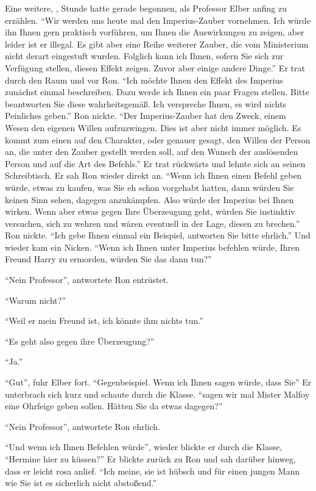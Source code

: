 Eine weitere, , Stunde \VgddK hatte gerade begonnen, als Professor Elber anfing zu erzählen. \enquote{Wir werden uns heute mal den Imperius-Zauber vornehmen. Ich würde ihn Ihnen gern praktisch vorführen, um Ihnen die Auswirkungen zu zeigen, aber leider ist er illegal. Es gibt aber eine Reihe weiterer Zauber, die vom Ministerium nicht derart eingestuft wurden. Folglich kann ich Ihnen, sofern Sie sich zur Verfügung stellen, diesen Effekt zeigen. Zuvor aber einige andere Dinge.} Er trat durch den Raum und vor Ron. \enquote{Ich möchte Ihnen den Effekt des Imperius zunächst einmal beschreiben. Dazu werde ich Ihnen ein paar Fragen stellen. Bitte beantworten Sie diese wahrheitsgemäß. Ich verspreche Ihnen, es wird nichts Peinliches geben.} Ron nickte. \enquote{Der Imperius-Zauber hat den Zweck, einem Wesen den eigenen Willen aufzuzwingen. Dies ist aber nicht immer möglich. Es kommt zum einen auf den Charakter, oder genauer gesagt, den Willen der Person an, die unter den Zauber gestellt werden soll, auf den Wunsch der auslösenden Person und auf die Art des Befehls.} Er trat rückwärts und lehnte sich an seinen Schreibtisch. Er sah Ron wieder direkt an. \enquote{Wenn ich Ihnen einen Befehl geben würde, etwas zu kaufen, was Sie eh schon vorgehabt hatten, dann würden Sie keinen Sinn sehen, dagegen anzukämpfen. Also würde der Imperius bei Ihnen wirken. Wenn aber etwas gegen Ihre Überzeugung geht, würden Sie instinktiv versuchen, sich zu wehren und wären eventuell in der Lage, diesen zu brechen.} Ron nickte. \enquote{Ich gebe Ihnen einmal ein Beispiel, antworten Sie bitte ehrlich.} Und wieder kam ein Nicken. \enquote{Wenn ich Ihnen unter Imperius befehlen würde, Ihren Freund Harry zu ermorden, würden Sie das dann tun?}

\enquote{Nein Professor}, antwortete Ron entrüstet.

\enquote{Warum nicht?}

\enquote{Weil er mein Freund ist, ich könnte ihm nichts tun.}

\enquote{Es geht also gegen ihre Überzeugung?}

\enquote{Ja.}

\enquote{Gut}, fuhr Elber fort. \enquote{Gegenbeispiel. Wenn ich Ihnen sagen würde, dass Sie\abs} Er unterbrach sich kurz und schaute durch die Klasse. \enquote{\aabs sagen wir mal Mister Malfoy eine Ohrfeige geben sollen. Hätten Sie da etwas dagegen?}

\enquote{Nein Professor}, antwortete Ron ehrlich.

\enquote{Und wenn ich Ihnen Befehlen würde\abs}, wieder blickte er durch die Klasse, \enquote{\aabs Hermine hier zu küssen?} Er blickte zurück zu Ron und sah darüber hinweg, dass er leicht rosa anlief. \enquote{Ich meine, sie ist hübsch und für einen jungen Mann wie Sie ist es sicherlich nicht abstoßend.}

